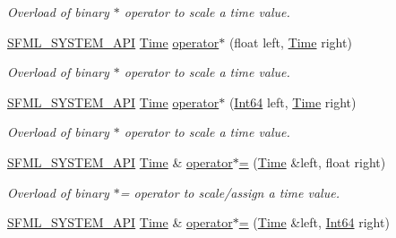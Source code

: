 \begin{DoxyCompactItemize}
\begin{DoxyCompactList}\small\item\em Overload of binary $\ast$ operator to scale a time value. \end{DoxyCompactList}\item 
\hyperlink{sfml_2dep_2_s_f_m_l-2_84_82_2include_2_s_f_m_l_2_system_2_export_8hpp_a6476c9e422606477a4c23d92b1d79a1f}{S\-F\-M\-L\-\_\-\-S\-Y\-S\-T\-E\-M\-\_\-\-A\-P\-I} \hyperlink{classsf_1_1_time}{Time} \hyperlink{classsf_1_1_time_a63723c9e9c5ff6151377ec4350c6f36e}{operator$\ast$} (float left, \hyperlink{classsf_1_1_time}{Time} right)
\begin{DoxyCompactList}\small\item\em Overload of binary $\ast$ operator to scale a time value. \end{DoxyCompactList}\item 
\hyperlink{sfml_2dep_2_s_f_m_l-2_84_82_2include_2_s_f_m_l_2_system_2_export_8hpp_a6476c9e422606477a4c23d92b1d79a1f}{S\-F\-M\-L\-\_\-\-S\-Y\-S\-T\-E\-M\-\_\-\-A\-P\-I} \hyperlink{classsf_1_1_time}{Time} \hyperlink{classsf_1_1_time_a40a6d0938fb4a43731d54fd90bfc6476}{operator$\ast$} (\hyperlink{namespacesf_a2840579fed3494d9f330baf7a5a19903}{Int64} left, \hyperlink{classsf_1_1_time}{Time} right)
\begin{DoxyCompactList}\small\item\em Overload of binary $\ast$ operator to scale a time value. \end{DoxyCompactList}\item 
\hyperlink{sfml_2dep_2_s_f_m_l-2_84_82_2include_2_s_f_m_l_2_system_2_export_8hpp_a6476c9e422606477a4c23d92b1d79a1f}{S\-F\-M\-L\-\_\-\-S\-Y\-S\-T\-E\-M\-\_\-\-A\-P\-I} \hyperlink{classsf_1_1_time}{Time} \& \hyperlink{classsf_1_1_time_a8996b6a6fcb8f3854b486b8e43949b50}{operator$\ast$=} (\hyperlink{classsf_1_1_time}{Time} \&left, float right)
\begin{DoxyCompactList}\small\item\em Overload of binary $\ast$= operator to scale/assign a time value. \end{DoxyCompactList}\item 
\hyperlink{sfml_2dep_2_s_f_m_l-2_84_82_2include_2_s_f_m_l_2_system_2_export_8hpp_a6476c9e422606477a4c23d92b1d79a1f}{S\-F\-M\-L\-\_\-\-S\-Y\-S\-T\-E\-M\-\_\-\-A\-P\-I} \hyperlink{classsf_1_1_time}{Time} \& \hyperlink{classsf_1_1_time_a6656a0a1a1802009a72d93fbba61f24a}{operator$\ast$=} (\hyperlink{classsf_1_1_time}{Time} \&left, \hyperlink{namespacesf_a2840579fed3494d9f330baf7a5a19903}{Int64} right)

\end{DoxyCompactItemize}
